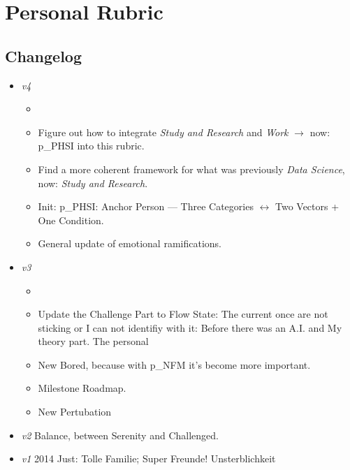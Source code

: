 \chapter{Personal Rubric}
\setcounter{section}{0}

\section*{Changelog}  
\begin{itemize}
	\item \textit{v4} \label{PR_v4}
	\begin{itemize}
		\item {}
		\item Figure out how to integrate \textit{Study and Research} and \textit{Work} $\rightarrow$ now: \gls{p_PHSI} into this rubric.
		\item Find a more coherent framework for what was previously \textit{Data Science}, now: \textit{Study and Research}.
		\item Init: \gls{p_PHSI}: Anchor Person — Three Categories $\leftrightarrow$ Two Vectors + One Condition.
		\item General update of emotional ramifications.
	\end{itemize}
	\item \textit{v3} \label{PR_v3}
	\begin{itemize}
	\item 	{}
	\item Update the Challenge Part to Flow State: The current once are not sticking or I can not identifiy with it: Before there was an A.I. and  My theory part. The personal
	\item New Bored, because with \gls{p_NFM} it's become more important.
	\item Milestone Roadmap.
	\item New Pertubation
	\end{itemize}
	\item \textit{v2} Balance, between Serenity and Challenged. \label{PR_v2}
	\item \textit{v1} 2014 Just: Tolle Familie; Super Freunde! Unsterblichkeit \label{PR_v1}
\end{itemize}

\pagebreak
